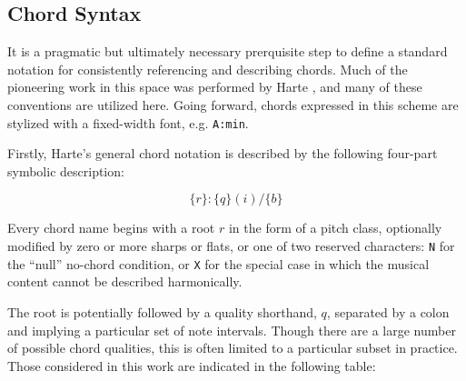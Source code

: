 \subsection{Chord Syntax}
\label{sec:chord_syntax}

It is a pragmatic but ultimately necessary prerquisite step to define a standard notation for consistently referencing and describing chords.
Much of the pioneering work in this space was performed by Harte \cite{Harte2010}, and many of these conventions are utilized here.
Going forward, chords expressed in this scheme are stylized with a fixed-width font, e.g. \texttt{A:min}.

Firstly, Harte's general chord notation is described by the following four-part symbolic description:

\begin{equation}
\{r\}:\{q\}(i)/\{b\}
\end{equation}

\noindent Every chord name begins with a root $r$ in the form of a pitch class, optionally modified by zero or more sharps or flats, or one of two reserved characters: \texttt{N} for the ``null'' no-chord condition, or \texttt{X} for the special case in which the musical content cannot be described harmonically.

The root is potentially followed by a quality shorthand, $q$, separated by a colon and implying a particular set of note intervals.
Though there are a large number of possible chord qualities, this is often limited to a particular subset in practice.
Those considered in this work are indicated in the following table:

